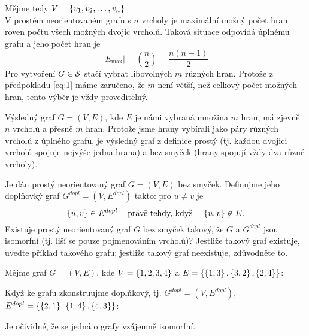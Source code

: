 \documentclass[11pt,a4paper]{article}
\begin{document}
\begin{solution}
Mějme tedy $V=\bc{v_1, v_2, \dots, v_n}$. \\
V prostém neorientovaném grafu s $n$ vrcholy je maximální možný počet hran roven počtu všech možných dvojic vrcholů.
Taková situace odpovídá úplnému grafu a jeho počet hran je
\begin{equation}
    |E_{\max{}}| = \binom{n}{2} = \frac{n(n-1)}{2}
\end{equation}
Pro vytvoření $G \in \S$ stačí vybrat libovolných $m$ různých hran. Protože z předpokladu \eqref{eq:1} máme zaručeno, že
$m$ není větší, než celkový počet možných hran, tento výběr je vždy proveditelný.

Výsledný graf $G = (V,E)$, kde $E$ je námi vybraná množina $m$ hran, má zjevně $n$ vrcholů a přesně $m$ hran. Protože
jsme hrany vybírali jako páry různých vrcholů z úplného grafu, je výsledný graf z definice prostý (tj. každou dvojici
vrcholů spojuje nejvýše jedna hrana) a bez smyček (hrany spojují vždy dva různé vrcholy).
\end{solution}

\begin{exercise}
Je dán prostý neorientovaný graf $G = (V,E)$ bez smyček. Definujme jeho doplňovký graf $G^{dopl} =
(V, E^{dopl})$ takto: pro $u \not= v$ je
\[
    \bc{u, v} \in E^{dopl} \hspace{3mm} \text{ právě tehdy, když } \hspace{3mm} \bc{u, v} \not\in E.
\]
Existuje prostý neorientovaný graf $G$ bez smyček takový, že $G$ a $G^{dopl}$ jsou isomorfní (tj. liší se pouze
pojmenováním vrcholů)? Jestliže takový graf existuje, uveďte příklad takového grafu; jestliže takový graf neexistuje,
zdůvodněte to.
\end{exercise}

\begin{solution}
Mějme graf $G=(V,E)$, kde $V=\bc{1,2,3,4}$ a $E=\bc{\bc{1,3}, \bc{3,2}, \bc{2,4}}$:
\begin{figure}[H]
    \centering
\end{figure}
Když ke grafu zkonstruujme doplňkový, tj. $G^{dopl} = (V, E^{dopl})$, $E^{dopl} = \bc{\bc{2,1}, \bc{1,4}, \bc{4,3}}$:
\begin{figure}[H]
    \centering
\end{figure}
Je očividné, že se jedná o grafy vzájemně isomorfní.
\end{solution}
\end{document}
